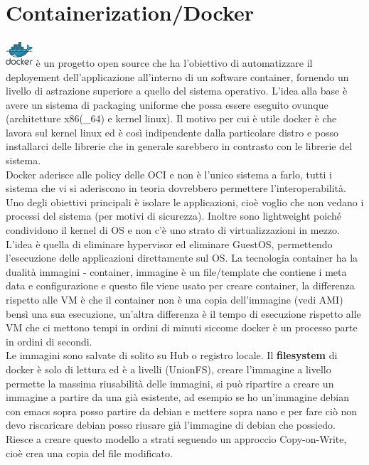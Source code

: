 \documentclass[11pt, twocolumn]{article}
\begin{document}
\section{Containerization/Docker}
\includegraphics[width=1cm,height=1cm]{imgs/dockerLogo.png}
è un progetto open source che ha l'obiettivo di automatizzare il deployement dell'applicazione all'interno di un software container, fornendo un livello di astrazione superiore a quello del sistema operativo. 
L'idea alla base è avere un sistema di packaging uniforme che possa essere eseguito ovunque (architetture x86(\_64) e kernel linux). 
Il motivo per cui è utile docker è che lavora sul kernel linux ed è così indipendente dalla particolare distro e posso installarci delle librerie che in generale sarebbero in contrasto con le librerie del sistema.\\
Docker aderisce alle policy delle OCI e non è l'unico sistema a farlo, tutti i sistema che vi si aderiscono in teoria dovrebbero permettere l'interoperabilità.
Uno degli obiettivi principali è isolare le applicazioni, cioè voglio che non vedano i processi del sistema (per motivi di sicurezza). 
Inoltre sono lightweight poiché condividono il kernel di OS e non c'è uno strato di virtualizzazioni in mezzo.\\
L'idea è quella di eliminare hypervisor ed eliminare GuestOS, permettendo l'esecuzione delle applicazioni direttamente sul OS. 
La tecnologia container ha la dualità immagini - container, immagine è un file/template che contiene i meta data e configurazione e questo file viene usato per creare container, la differenza rispetto alle VM è che il container non è una copia dell'immagine (vedi AMI) bensì una sua esecuzione, un'altra differenza è il tempo di esecuzione rispetto alle VM che ci mettono tempi in ordini di minuti siccome docker è un processo parte in ordini di secondi.\\
Le immagini sono salvate di solito su Hub o registro locale.
Il \textbf{filesystem} di docker è solo di lettura ed è a livelli (UnionFS), creare l'immagine a livello permette la massima riusabilità delle immagini, si può ripartire a creare un immagine a partire da una già esistente, ad esempio se ho un'immagine debian con emacs sopra posso partire da debian e mettere sopra nano e per fare ciò non devo riscaricare debian posso riusare già l'immagine di debian che possiedo. Riesce a creare questo modello a strati seguendo un approccio Copy-on-Write, cioè crea una copia del file modificato. 
\end{document}
